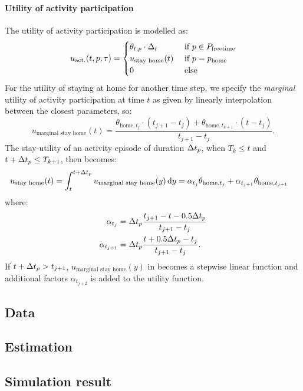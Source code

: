 \paragraph{Utility of activity participation}
The utility of activity participation is modelled as:
\begin{equation}
	\uact(t,p,\atime) = \begin{cases} 
	\theta_{t,p} \cdot \Delta_t &\cif p \in P_{\text{freetime}} \\
	u_\text{stay home}(t) & \cif p = p_\text{home} \\
	0 & \celse
	\end{cases}
\end{equation}
\newcommand{\home}{\text{home}}
 For the utility of staying at home for another time step, we specify the \emph{marginal} utility of activity participation at time $t$ as given by linearly interpolation between the closest parameters, so:
\begin{equation*}
u_\text{marginal stay home}(t) = \frac{\theta_{\home,t_j}\cdot(t_{j+1}-t_j)+\theta_{\home,t_{k+1}}\cdot(t-t_j) }{t_{j+1}-t_{j}}.
\end{equation*}
The stay-utility of an activity episode of duration $\Delta t_p$, when $T_k\leq t$ and $t+\Delta t_p\leq T_{k+1}$, then becomes:
\begin{equation} \label{eq:uacttime}
\begin{aligned}
u_\text{stay home}(t) &= \int_t^{t+\dura{p}} u_\text{marginal stay home}(y)
\ud{y} = \alpha_{t_j}\theta_{\home,t_j} + \alpha_{t_{j+1}}\theta_{\home,t_{j+1}}%
\end{aligned}
\end{equation}
where:
\begin{align*}
\alpha_{t_j}&=\dura{p}\frac{t_{j+1} - t - 0.5 \dura{p}}{t_{j+1}-t_{j}}\\
\alpha_{t_{j+1}}&=\dura{p}\frac{t + 0.5\dura{p} - t_j}{t_{j+1}-t_{j}}.
\end{align*}
If $t+\Delta t_p> t_{j+1}$, $u_\text{marginal stay home}(y)$ in  becomes a stepwise linear function and additional factors $\alpha_{t_{j+2}}$ is added to the utility function.

\subsection{Data}


\subsection{Estimation}



\subsection{Simulation result}




